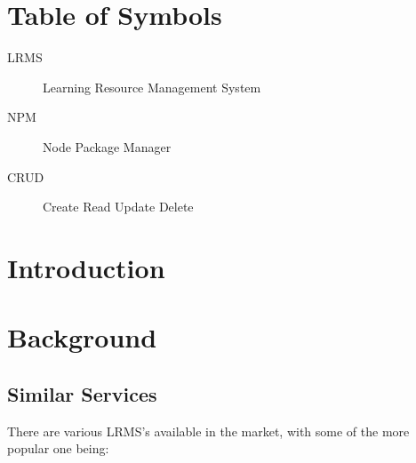 \documentclass[12pt, a4paper,twoside]{report}
\theoremstyle{plain} %
\theoremstyle{definition} %
\numberwithin{equation}{chapter}
\begin{document}

\tableofcontents

\chapter{Table of Symbols}

\begin{description}
    \item[LRMS] Learning Resource Management System
    \item[NPM] Node Package Manager
    \item[CRUD] Create Read Update Delete 
\end{description}

\chapter{Introduction}\label{ch:introduction}


\chapter{Background}\label{ch:background}

\section{Similar Services}\label{sec:similarservices}

There are various LRMS's available in the market, with some of the more popular
one being:
\end{document}
